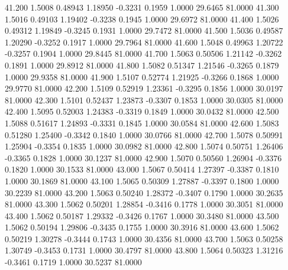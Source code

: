   41.200   1.5008   0.48943   1.18950  -0.3231   0.1959   1.0000  29.6465  81.0000
  41.300   1.5016   0.49103   1.19402  -0.3238   0.1945   1.0000  29.6972  81.0000
  41.400   1.5026   0.49312   1.19849  -0.3245   0.1931   1.0000  29.7472  81.0000
  41.500   1.5036   0.49587   1.20290  -0.3252   0.1917   1.0000  29.7964  81.0000
  41.600   1.5048   0.49963   1.20722  -0.3257   0.1904   1.0000  29.8445  81.0000
  41.700   1.5063   0.50506   1.21142  -0.3262   0.1891   1.0000  29.8912  81.0000
  41.800   1.5082   0.51347   1.21546  -0.3265   0.1879   1.0000  29.9358  81.0000
  41.900   1.5107   0.52774   1.21925  -0.3266   0.1868   1.0000  29.9770  81.0000
  42.200   1.5109   0.52919   1.23361  -0.3295   0.1856   1.0000  30.0197  81.0000
  42.300   1.5101   0.52437   1.23873  -0.3307   0.1853   1.0000  30.0305  81.0000
  42.400   1.5095   0.52003   1.24383  -0.3319   0.1849   1.0000  30.0432  81.0000
  42.500   1.5088   0.51617   1.24893  -0.3331   0.1845   1.0000  30.0584  81.0000
  42.600   1.5083   0.51280   1.25400  -0.3342   0.1840   1.0000  30.0766  81.0000
  42.700   1.5078   0.50991   1.25904  -0.3354   0.1835   1.0000  30.0982  81.0000
  42.800   1.5074   0.50751   1.26406  -0.3365   0.1828   1.0000  30.1237  81.0000
  42.900   1.5070   0.50560   1.26904  -0.3376   0.1820   1.0000  30.1533  81.0000
  43.000   1.5067   0.50414   1.27397  -0.3387   0.1810   1.0000  30.1869  81.0000
  43.100   1.5065   0.50309   1.27887  -0.3397   0.1800   1.0000  30.2239  81.0000
  43.200   1.5063   0.50240   1.28372  -0.3407   0.1790   1.0000  30.2635  81.0000
  43.300   1.5062   0.50201   1.28854  -0.3416   0.1778   1.0000  30.3051  81.0000
  43.400   1.5062   0.50187   1.29332  -0.3426   0.1767   1.0000  30.3480  81.0000
  43.500   1.5062   0.50194   1.29806  -0.3435   0.1755   1.0000  30.3916  81.0000
  43.600   1.5062   0.50219   1.30278  -0.3444   0.1743   1.0000  30.4356  81.0000
  43.700   1.5063   0.50258   1.30749  -0.3453   0.1731   1.0000  30.4797  81.0000
  43.800   1.5064   0.50323   1.31216  -0.3461   0.1719   1.0000  30.5237  81.0000
